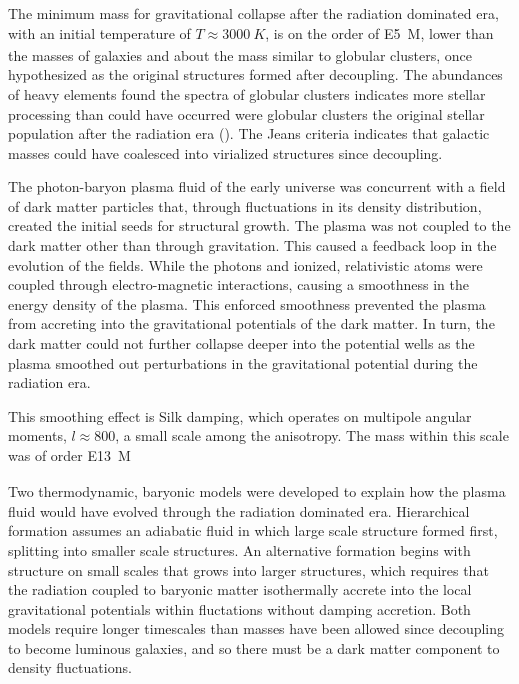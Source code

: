 \documentclass{paper}
\begin{document}
  The minimum mass for gravitational collapse after the radiation dominated
  era, with an initial temperature of \(T \approx \SI{3000}{K}\), is on the 
  order of \SI{E5}{M_{\astrosun}}, lower than the masses of galaxies and about 
  the mass similar to globular clusters, once hypothesized as the original
  structures formed after decoupling. The abundances of heavy elements found
  the spectra of globular clusters indicates more stellar processing than 
  could have occurred were globular clusters the original stellar population
  after the radiation era (\cite{Kalirai_2010}). The Jeans criteria indicates 
  that galactic masses could have coalesced into virialized structures since
  decoupling.

  The photon-baryon plasma fluid of the early universe was concurrent with
  a field of dark matter particles that, through fluctuations in its density 
  distribution, created the initial seeds for structural growth. The plasma
  was not coupled to the dark matter other than through gravitation. This
  caused a feedback loop in the evolution of the fields. While the photons 
  and ionized, relativistic atoms were coupled through electro-magnetic 
  interactions, causing a smoothness in the energy density of the plasma. This 
  enforced smoothness prevented the plasma from accreting into the 
  gravitational potentials of the dark matter. In turn, the dark matter could 
  not further collapse deeper into the potential wells as the plasma smoothed 
  out perturbations in the gravitational potential during the radiation era.

  This smoothing effect is Silk damping, which operates on multipole
  angular moments, \(l \approx 800\), a small scale among the anisotropy. 
  The mass within this scale was of order \SI{E13}{M_{\astrosun}}

  Two thermodynamic, baryonic models were developed to explain how the plasma 
  fluid would have evolved through the radiation dominated era. Hierarchical
  formation assumes an adiabatic fluid in which large scale structure formed
  first, splitting into smaller scale structures. An alternative formation
  begins with structure on small scales that grows into larger structures, 
  which requires that the radiation coupled to baryonic matter isothermally
  accrete into the local gravitational potentials within fluctations without 
  damping accretion. Both models require longer timescales than masses have
  been allowed since decoupling to become luminous galaxies, and so there
  must be a dark matter component to density fluctuations.
\end{document}
